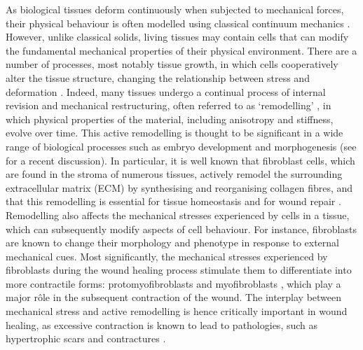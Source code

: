 As biological tissues deform continuously when subjected to mechanical forces, their physical behaviour is often modelled using classical continuum mechanics \citep{Murray2001}. However, unlike classical solids, living tissues may contain cells that can modify the fundamental mechanical properties of their physical environment. There are a number of processes, most notably tissue growth, in which cells cooperatively alter the tissue structure, changing the relationship between stress and deformation \citep{Chen2000}. Indeed, many tissues undergo a continual process of internal revision and mechanical restructuring, often referred to as `remodelling' \citep{Taber1995}, in which physical properties of the material, including anisotropy and stiffness, evolve over time. This active remodelling is thought to be significant in a wide range of biological processes such as embryo development and morphogenesis (see \citet{Patwari2008} for a recent discussion). In particular, it is well known that fibroblast cells, which are found in the stroma of numerous tissues, actively remodel the surrounding extracellular matrix (ECM) by synthesising and reorganising collagen fibres, and that this remodelling is essential for tissue homeostasis and for wound repair \citep{Grinnell2003,MajnoCells}.  Remodelling also affects the mechanical stresses experienced by cells in a tissue, which can subsequently modify aspects of cell behaviour. For instance, fibroblasts are known to change their morphology \citep{Gabbiani2003,Tamariz2002,Tomasek2002} and phenotype \citep{Amadeu2003,Gabbiani2003,Tomasek2002} in response to external mechanical cues. Most significantly, the mechanical stresses experienced by fibroblasts during the wound healing process stimulate them to differentiate into more contractile forms: protomyofibroblasts and myofibroblasts \citep{Desmouliere2005,Gabbiani1972,Tomasek2002}, which play a major r\^{o}le in the subsequent contraction of the wound. The interplay between mechanical stress and active remodelling is hence critically important in wound healing, as excessive contraction is known to lead to pathologies, such as hypertrophic scars and contractures \citep{Roseborough2004,Enoch2005,Murphy2011b}.

